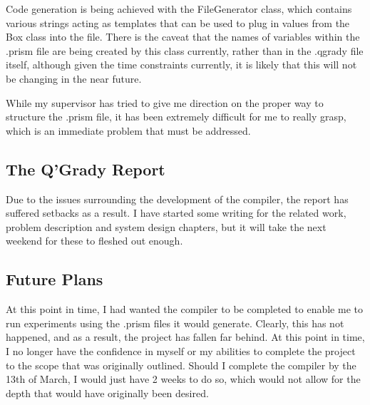 \documentclass[report.tex]{subfiles}
\begin{document}
Code generation is being achieved with the FileGenerator class, which contains
various strings acting as templates that can be used to plug in values from
the Box class into the file. There is the caveat that the names of variables
within the .prism file are being created by this class currently, rather than
in the .qgrady file itself, although given the time constraints currently, it is
likely that this will not be changing in the near future.

While my supervisor has tried to give me direction on the proper way to
structure the .prism file, it has been extremely difficult for me to really
grasp, which is an immediate problem that must be addressed.

\subsection{The Q'Grady Report} %
\label{sub:the_q_grady_report}
Due to the issues surrounding the development of the compiler, the report has
suffered setbacks as a result. I have started some writing for the related work,
problem description and system design chapters, but it will take the next
weekend for these to fleshed out enough.

\subsection{Future Plans} %
\label{sub:future_plans}
At this point in time, I had wanted the compiler to be completed to enable me to
run experiments using the .prism files it would generate. Clearly, this has not
happened, and as a result, the project has fallen far behind. At this point in
time, I no longer have the confidence in myself or my abilities to complete the
project to the scope that was originally outlined. Should I complete the
compiler by the 13th of March, I would just have 2 weeks to do so, which would
not allow for the depth that would have originally been desired.

\newpage
\end{document}
